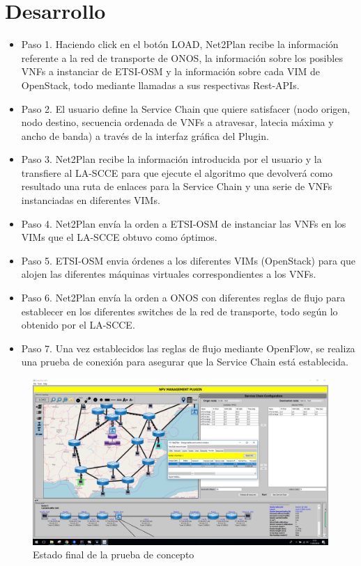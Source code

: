 \section{Desarrollo}
\begin{itemize}
	\item Paso 1. Haciendo click en el botón LOAD, Net2Plan recibe la información referente a la red de transporte de ONOS, la información sobre los posibles VNFs a instanciar de ETSI-OSM y la información sobre cada VIM de OpenStack, todo mediante llamadas a sus respectivas Rest-APIs.
	
	\item Paso 2. El usuario define la Service Chain que quiere satisfacer (nodo origen, nodo destino, secuencia ordenada de VNFs a atravesar, latecia máxima y ancho de banda) a través de la interfaz gráfica del Plugin.
	
	\item Paso 3. Net2Plan recibe la información introducida por el usuario y la transfiere al LA-SCCE para que ejecute el algoritmo que devolverá como resultado una ruta de enlaces para la Service Chain y una serie de VNFs instanciadas en diferentes VIMs.
	
	\item Paso 4. Net2Plan envía la orden a ETSI-OSM de instanciar las VNFs en los VIMs que el LA-SCCE obtuvo como óptimos.
	
	\item Paso 5. ETSI-OSM envia órdenes a los diferentes VIMs (OpenStack) para que alojen las diferentes máquinas virtuales correspondientes a los VNFs.
	
	\item Paso 6. Net2Plan envía la orden a ONOS con diferentes reglas de flujo para establecer en los diferentes switches de la red de transporte, todo según lo obtenido por el LA-SCCE.
	
	\item Paso 7. Una vez establecidos las reglas de flujo mediante OpenFlow, se realiza una prueba de conexión para asegurar que la Service Chain está establecida.
\end{itemize}

\begin{figure}[!ht]
	\centering
	\includegraphics[width=0.7\linewidth]{imagenes/nfv_service_chain}
	\caption{Estado final de la prueba de concepto}
	\label{fig:nfvservicechain}
\end{figure}